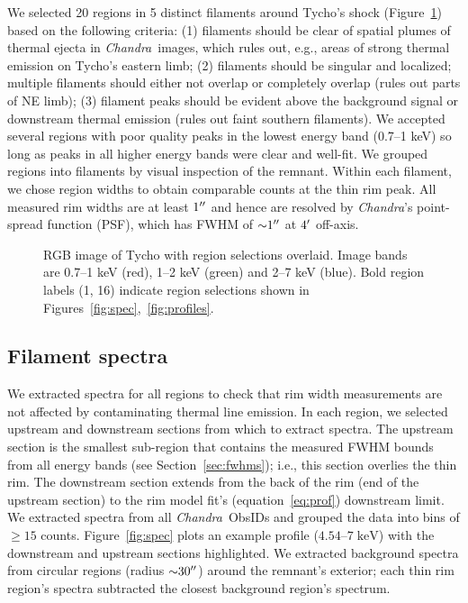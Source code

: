\documentclass[iop, apj, numberedappendix]{emulateapj}
\newcommand*{\mt}{\mathrm}
\newcommand*{\unit}[1]{\;\mt{#1}}  %
\newcommand*{\abt}{\mathord{\sim}} %
\newcommand*{\Chandra}{\textit{Chandra}\ }
\begin{document}
We selected 20 regions in 5 distinct filaments around Tycho's shock
(Figure~\ref{fig:snr}) based on the following criteria: (1) filaments should be
clear of spatial plumes of thermal ejecta in \Chandra images, which rules out,
e.g., areas of strong thermal emission on Tycho's eastern limb; (2) filaments
should be singular and localized; multiple filaments should either not
overlap or completely overlap (rules out parts of NE limb); (3) filament
peaks should be evident above the background signal or downstream thermal
emission (rules out faint southern filaments).  We accepted several
regions with poor quality peaks in the lowest energy band (0.7--1 keV) so long
as peaks in all higher energy bands were clear and well-fit.
We grouped regions into filaments by visual inspection of the remnant.
Within each filament, we chose region widths to obtain comparable counts
at the thin rim peak.
All measured rim widths are at least $1\mbox{$^{\prime\prime}$}$ and hence are resolved by
\textit{Chandra}'s point-spread function (PSF), which has FWHM of
$\abt 1\arcsec$ at $4\mbox{$^\prime$}$ off-axis.

\begin{figure}
    \centering
    \caption{RGB image of Tycho with region selections overlaid.  Image bands
    are 0.7--1 keV (red), 1--2 keV (green) and 2--7 keV (blue).  Bold region
    labels (1, 16) indicate region selections shown in
    Figures~\ref{fig:spec},~\ref{fig:profiles}.
     \label{fig:snr}}
\end{figure}

\subsection{Filament spectra}
\label{sec:spec}

We extracted spectra for all regions to check that rim width measurements are
not affected by contaminating thermal line emission.  In each region, we
selected upstream and downstream sections from which to extract spectra.  The
upstream section is the smallest sub-region that contains the measured FWHM
bounds from all energy bands (see Section~\ref{sec:fwhms}); i.e., this section
overlies the thin rim.  The downstream section extends from the back of the rim
(end of the upstream section) to the rim model fit's (equation~\eqref{eq:prof})
downstream limit.  We extracted spectra from all \Chandra ObsIDs and grouped
the data into bins of $\geq 15$ counts.  Figure~\ref{fig:spec} plots an example
profile ($4.54$--$7 \unit{keV}$) with the downstream and upstream sections
highlighted.  We extracted background spectra from circular regions (radius
$\abt 30\arcsec$) around the remnant's exterior; each thin rim region's spectra
subtracted the closest background region's spectrum.
\end{document}
